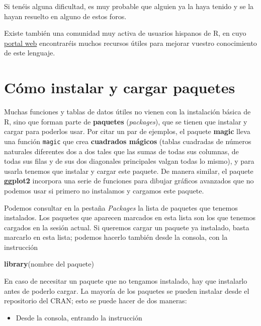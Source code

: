 \documentclass[]{book}
\newenvironment{Shaded}{\begin{snugshade}}{\end{snugshade}}
\newcommand{\KeywordTok}[1]{\textcolor[rgb]{0.13,0.29,0.53}{\textbf{#1}}}
\newcommand{\NormalTok}[1]{#1}
\providecommand{\tightlist}{%
  \setlength{\itemsep}{0pt}\setlength{\parskip}{0pt}}
\theoremstyle{definition}
\theoremstyle{definition}
\theoremstyle{definition}
\theoremstyle{remark}
\begin{document}
Si tenéis alguna dificultad, es muy probable que alguien ya la haya tenido y se la hayan resuelto en alguno de estos foros.

Existe también una comunidad muy activa de usuarios hispanos de R, en cuyo \href{http://r-es.org/Comunidad}{portal web} encontraréis muchos recursos útiles para mejorar vuestro conocimiento de este lenguaje.

\hypertarget{sec:paquetes}{%
\section{Cómo instalar y cargar paquetes}\label{sec:paquetes}}

Muchas funciones y tablas de datos útiles no vienen con la instalación básica de R, sino que forman parte de \textbf{paquetes} (\emph{packages}), que se tienen que instalar y cargar para poderlos usar. Por citar un par de ejemplos, el paquete \textbf{magic} lleva una función \texttt{magic} que crea \textbf{cuadrados mágicos} (tablas cuadradas de números naturales diferentes dos a dos tales que las sumas de todas sus columnas, de todas sus filas y de sus dos diagonales principales valgan todas lo mismo), y para usarla tenemos que instalar y cargar este paquete. De manera similar, el paquete \textbf{ggplot2} incorpora una serie de funciones para dibujar gráficos avanzados que no podemos usar si primero no instalamos y cargamos este paquete.

Podemos consultar en la pestaña \emph{Packages} la lista de paquetes que tenemos instalados. Los paquetes que aparecen marcados en esta lista son los que tenemos cargados en la sesión actual. Si queremos cargar un paquete ya instalado, basta marcarlo en esta lista; podemos hacerlo también desde la consola, con la instrucción

\begin{Shaded}
\begin{Highlighting}[]
\KeywordTok{library}\NormalTok{(nombre del paquete)}
\end{Highlighting}
\end{Shaded}

En caso de necesitar un paquete que no tengamos instalado, hay que instalarlo antes de poderlo cargar. La mayoría de los paquetes se pueden instalar desde el repositorio del CRAN; esto se puede hacer de dos maneras:

\begin{itemize}
\tightlist
\item
  Desde la consola, entrando la instrucción
\end{itemize}
\end{document}
